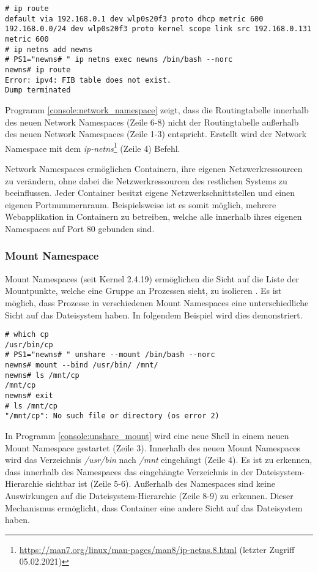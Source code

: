 \begin{lstlisting}[label={console:network_namespace},caption={Beispiel für Network Namespace}]
# ip route
default via 192.168.0.1 dev wlp0s20f3 proto dhcp metric 600
192.168.0.0/24 dev wlp0s20f3 proto kernel scope link src 192.168.0.131 metric 600
# ip netns add newns
# PS1="newns# " ip netns exec newns /bin/bash --norc
newns# ip route
Error: ipv4: FIB table does not exist.
Dump terminated
\end{lstlisting}

Programm \ref{console:network_namespace} zeigt, dass die Routingtabelle
innerhalb des neuen Network Namespaces (Zeile 6-8) nicht der Routingtabelle
au{\ss}erhalb des neuen Network Namespaces (Zeile 1-3) entspricht. Erstellt
wird der Network Namespace mit dem
\mbox{\emph{ip-netns}}\footnote{\url{https://man7.org/linux/man-pages/man8/ip-netns.8.html}
(letzter Zugriff 05.02.2021)} (Zeile 4) Befehl.

Network Namespaces ermöglichen Containern, ihre eigenen Netzwerkressourcen zu
verändern, ohne dabei die Netzwerkressourcen des restlichen Systems zu
beeinflussen. Jeder Container besitzt eigene Netzwerkschnittstellen und einen
eigenen Portnummernraum. Beispielsweise ist es somit möglich, mehrere
Webapplikation in Containern zu betreiben, welche alle innerhalb ihres eigenen
Namespaces auf Port 80 gebunden sind.

\subsubsection{Mount Namespace}
Mount Namespaces (seit Kernel 2.4.19) ermöglichen die Sicht auf die Liste der
Mountpunkte, welche eine Gruppe an Prozessen sieht, zu isolieren
\cite{man_mount_namespaces}. Es ist möglich, dass Prozesse in verschiedenen
Mount Namespaces eine unterschiedliche Sicht auf das Dateisystem haben. In
folgendem Beispiel wird dies demonstriert.

\begin{lstlisting}[label={console:unshare_mount},caption={Beispiel für Mount Namespace}]
# which cp
/usr/bin/cp
# PS1="newns# " unshare --mount /bin/bash --norc
newns# mount --bind /usr/bin/ /mnt/
newns# ls /mnt/cp
/mnt/cp
newns# exit
# ls /mnt/cp
"/mnt/cp": No such file or directory (os error 2)

\end{lstlisting}
In Programm \ref{console:unshare_mount} wird eine neue Shell in einem neuen
Mount Namespace gestartet (Zeile 3). Innerhalb des neuen Mount Namespaces wird
das Verzeichnis \emph{/usr/bin} nach \emph{/mnt} eingehängt (Zeile 4). Es ist
zu erkennen, dass innerhalb des Namespaces das eingehängte Verzeichnis in der
Dateisystem-Hierarchie sichtbar ist (Zeile 5-6). Au{\ss}erhalb des Namespaces
sind keine Auswirkungen auf die Dateisystem-Hierarchie (Zeile 8-9) zu erkennen.
Dieser Mechanismus ermöglicht, dass Container eine andere Sicht auf das
Dateisystem haben.

